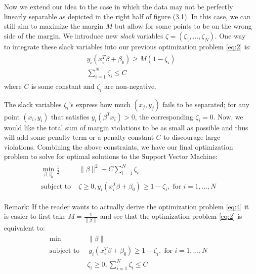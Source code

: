 \documentclass[twoside]{article}
\begin{document}
Now we extend our idea to the case in which the data may not be perfectly linearly separable as depicted in the right half of figure (3.1). In this case, we can still aim to maximize the margin $M$ but allow for some points to be on the wrong side of the margin. We introduce new \emph{slack} variables $\zeta = (\zeta_{1}, \dots ,\zeta_{N})$. One way to integrate these slack variables into our previous optimization problem \ref{eq:2} is:
\begin{align} \label{eq:3}
\begin{split}
    &y_{i}(x_{i}^{T}\beta + \beta_{0}) \geq M(1-\zeta_{i})\\
    &\sum_{i=1}^{N}\zeta_{i} \leq C
\end{split}
\end{align}
where $C$ is some constant and $\zeta_i$ are non-negative.

The slack variables $\zeta_{i}$'s express how much $(x_j,y_j)$ fails to be separated; for any point $(x_{i}, y_{i})$ that satisfies $y_{i}(\beta^{T}x_{i}) > 0$, the corresponding $\zeta_{i} = 0$. Now, we would like the total sum of margin violations to be as small as possible and thus will add some penalty term or a penalty constant $C$ to discourage large violations. Combining the above constraints, we have our final optimization problem to solve for optimal solutions to the Support Vector Machine:
\begin{align} \label{eq:4}
\begin{split}
    \min_{\beta, \beta_{0}}\frac{1}{2} &\|\beta\|^{2} + C\sum_{i=1}^{N}\zeta_{i}\\
    \text{subject to }
    &\zeta \geq 0, y_{i}(x_{i}^T\beta + \beta_{0}) \geq 1 - \zeta_{i}, \text{ for } i = 1, \dots, N
\end{split}
\end{align}

Remark: If the reader wants to actually derive the optimization problem \ref{eq:4} it is easier to first take $M = \frac{1}{\|\beta\|}$ and see that the optimization problem \ref{eq:2} is equivalent to:
\begin{align*}
\begin{split}
    \min &\|\beta\|\\
    \text{subject to }
    &\ y_{i}(x_{i}^{T}\beta + \beta_{0}) \geq 1-\zeta_{i}, \text{ for } i = 1, \dots, N\\
    &\zeta_{i} \geq 0, \sum_{i=1}^{N}\zeta_{i} \leq C
\end{split}
\end{align*}
\end{document}

